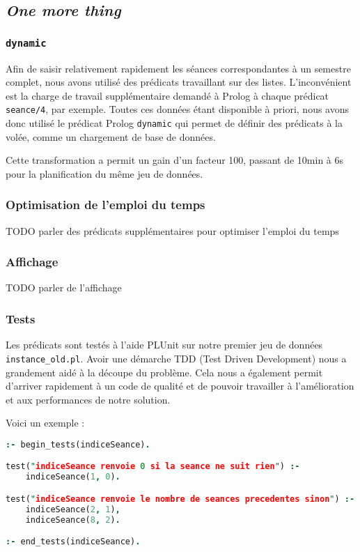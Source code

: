 
\subsection{\textit{One more thing}}

\subsubsection{\texttt{dynamic}}

Afin de saisir relativement rapidement les séances correspondantes à un semestre
complet, nous avons utilisé des prédicats travaillant sur des listes.
L'inconvénient est la charge de travail supplémentaire demandé à Prolog à chaque
prédicat \texttt{seance/4}, par exemple.
Toutes ces données étant disponible à priori, nous avons donc utilisé le
prédicat Prolog \texttt{dynamic} qui permet de définir des prédicats à la volée,
comme un chargement de base de données.

Cette transformation a permit un gain d'un facteur 100, passant de 10min à 6s
pour la planification du même jeu de données.

\subsubsection{Optimisation de l'emploi du temps}
TODO parler des prédicats supplémentaires pour optimiser l'emploi du temps

\subsubsection{Affichage}
TODO parler de l'affichage

\subsubsection{Tests}

Les prédicats sont testés à l'aide PLUnit sur notre premier jeu de données
\texttt{instance\_old.pl}. Avoir une démarche TDD (Test Driven Development) nous
a grandement aidé à la découpe du problème. Cela nous a également permit
d'arriver rapidement à un code de qualité et de pouvoir travailler à
l'amélioration et aux performances de notre solution.

Voici un exemple :

\begin{lstlisting}[language=Prolog, caption=Exemple de test, captionpos=b,
label={lst:test}]
:- begin_tests(indiceSeance).

test("indiceSeance renvoie 0 si la seance ne suit rien") :-
    indiceSeance(1, 0).

test("indiceSeance renvoie le nombre de seances precedentes sinon") :-
    indiceSeance(2, 1),
    indiceSeance(8, 2).

:- end_tests(indiceSeance).
\end{lstlisting}


